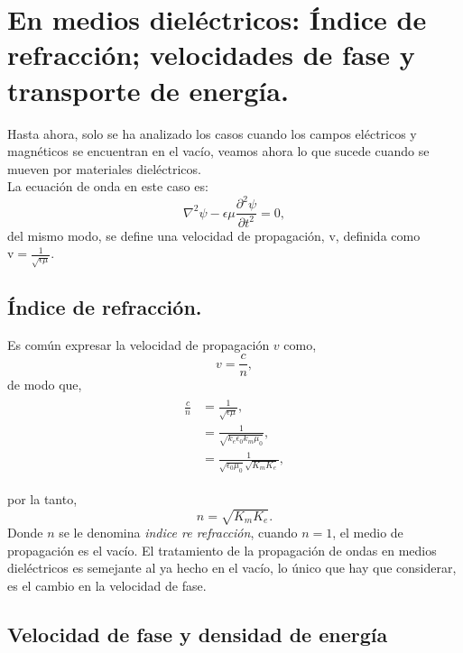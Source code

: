 \documentclass[11pt,fleqn]{book} %
\begin{document}
\section{En medios diel\'ectricos: \'Indice de refracci\'on; velocidades de fase y transporte de energ\'ia.}
Hasta ahora, solo se ha analizado los casos cuando los campos el\'ectricos y magn\'eticos se encuentran en el vac\'io, veamos ahora
lo que sucede cuando se mueven por materiales diel\'ectricos.\\
La ecuaci\'on de onda en este caso es:
\begin{equation}
 \nabla^2 \psi-\epsilon\mu\frac{\partial^2 \psi}{\partial t^2}=0,
\end{equation}
del mismo modo, se define una velocidad de propagaci\'on, $\mbox{v}$, definida como $\mbox{v}=\frac{1}{\sqrt{\epsilon\mu}}$.
\subsection{\'Indice de refracci\'on.}
Es com\'un expresar la velocidad de propagaci\'on $v$ como,
\begin{equation}
v=\frac{c}{n},
\end{equation}
de modo que,
\begin{eqnarray*}
\begin{split}
\frac{c}{n}&=\frac{1}{\sqrt{\epsilon \mu}},\\
&=\frac{1}{\sqrt{k_{e}\epsilon_{0} k_m\mu_0}},\\
&=\frac{1}{\sqrt{\epsilon_0\mu_0}\sqrt{K_mK_e}},
\end{split}
\end{eqnarray*}

por la tanto,
\begin{equation}
n=\sqrt{K_mK_e}.
\end{equation}
Donde $n$ se le denomina \textit{indice re refracci\'on}, cuando $n=1$, el medio de propagaci\'on es el vac\'io.
El tratamiento de la propagaci\'on de ondas en medios diel\'ectricos es semejante al ya hecho en el vac\'io, lo \'unico que hay que considerar, es el cambio en la velocidad de fase.\\
\subsection{Velocidad de fase y densidad de energ\'ia}
\end{document}
